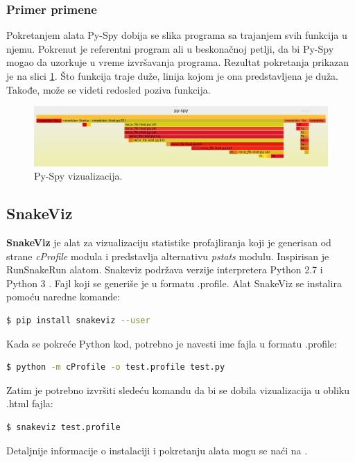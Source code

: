 \documentclass[a4paper]{article}
\begin{document}
\subsubsection{Primer primene}
Pokretanjem alata Py-Spy dobija se slika programa sa trajanjem svih funkcija u njemu. Pokrenut je referentni program ali u beskonačnoj petlji, da bi Py-Spy mogao da uzorkuje u vreme izvršavanja programa. Rezultat pokretanja prikazan je na slici \ref{fig:ps_viz}. Što funkcija traje duže, linija kojom je ona predstavljena je duža. Takođe, može se videti redosled poziva funkcija. 
\begin{figure}[h!]
\begin{center}
\includegraphics[scale=0.26]{MVJ_02_ProfajleriZaPython_ZecevicSmiljanicMilovanovicPopov/ps.png}
\end{center}
\caption{Py-Spy vizualizacija.}
\label{fig:ps_viz}
\end{figure}

\subsection{SnakeViz} 
\label{profajler_2}
\textbf{SnakeViz} je alat za vizualizaciju statistike profajliranja koji je generisan od strane {\em cProfile} modula i predstavlja alternativu {\em pstats} modulu. Inspirisan je RunSnakeRun alatom. Snakeviz podržava verzije interpretera Python 2.7 i Python 3 \cite{SnakeViz1}. Fajl koji se generiše je u formatu .profile. Alat SnakeViz se instalira pomoću naredne komande:
\begin{lstlisting}[language=bash, belowskip=-\baselineskip]
  $ pip install snakeviz --user
\end{lstlisting}
Kada se pokreće Python kod, potrebno je navesti ime fajla u formatu .profile:
\begin{lstlisting}[language=bash, belowskip=-\baselineskip]
  $ python -m cProfile -o test.profile test.py
\end{lstlisting}
Zatim je potrebno izvršiti sledeću komandu da bi se dobila vizualizacija u obliku .html fajla:
\begin{lstlisting}[language=bash, belowskip=-\baselineskip]
  $ snakeviz test.profile
\end{lstlisting}
Detaljnije informacije o instalaciji i pokretanju alata mogu se naći na \cite{SnakeViz1}.
\end{document}
